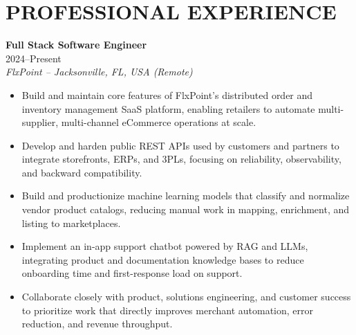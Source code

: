 \documentclass[a4paper,9pt]{extarticle}
\begin{document}


\section*{PROFESSIONAL EXPERIENCE}

\noindent
\textbf{Full Stack Software Engineer} \\
2024--Present \\
\textit{FlxPoint -- Jacksonville, FL, USA (Remote)}
\begin{itemize}[leftmargin=*]
\item Build and maintain core features of FlxPoint's distributed order and inventory management SaaS platform, enabling retailers to automate multi-supplier, multi-channel eCommerce operations at scale.
\item Develop and harden public REST APIs used by customers and partners to integrate storefronts, ERPs, and 3PLs, focusing on reliability, observability, and backward compatibility.
\item Build and productionize machine learning models that classify and normalize vendor product catalogs, reducing manual work in mapping, enrichment, and listing to marketplaces.
\item Implement an in-app support chatbot powered by RAG and LLMs, integrating product and documentation knowledge bases to reduce onboarding time and first-response load on support.
\item Collaborate closely with product, solutions engineering, and customer success to prioritize work that directly improves merchant automation, error reduction, and revenue throughput. \\
\end{itemize}
\end{document}
